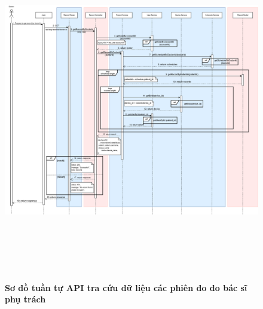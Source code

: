 \begin{figure}[H]
	\centering
	\includegraphics[width=15cm,height=15cm]{Images/api_sequence/record/getRecordByDoctorId.drawio.png}
	\caption[Sơ đồ tuần tự API tra cứu dữ liệu các phiên đo do bác sĩ phụ trách]{\bfseries \fontsize{12pt}{0pt}\selectfont Sơ đồ tuần tự API tra cứu dữ liệu các phiên đo do bác sĩ phụ trách}
	\label{sequence_diagram_get_record_by_doctor_id}
\end{figure}


